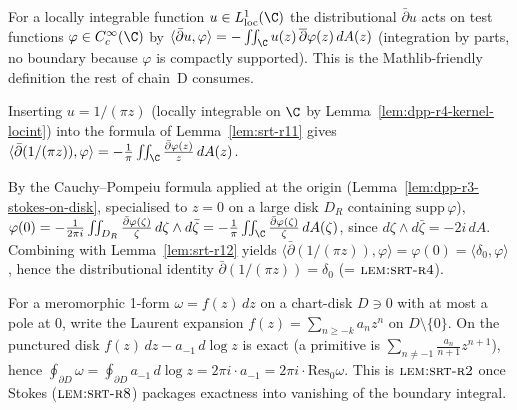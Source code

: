 \begin{lemma}
\label{lem:srt-r11}
For a locally integrable function $u \in L^{1}_{\mathrm{loc}}(\C)$
the distributional $\bar\partial u$ acts on test functions
$\varphi \in C^{\infty}_{c}(\C)$ by
$\langle \bar\partial u, \varphi\rangle = -\iint_{\C} u(z)\,
\overline{\partial}\varphi(z)\,dA(z)$
(integration by parts, no boundary because $\varphi$ is compactly
supported).  This is the Mathlib-friendly definition the rest of
chain~D consumes.
\leanok
\end{lemma}

\begin{lemma}
\label{lem:srt-r12}
Inserting $u = 1/(\pi z)$ (locally integrable on $\C$ by
Lemma~\ref{lem:dpp-r4-kernel-locint}) into the formula of
Lemma~\ref{lem:srt-r11} gives
$\langle \bar\partial(1/(\pi z)), \varphi\rangle =
-\frac{1}{\pi}\iint_{\C} \frac{\bar\partial \varphi(z)}{z}\,dA(z)$.
\leanok
\end{lemma}

\begin{lemma}
\label{lem:srt-r13}
By the Cauchy--Pompeiu formula applied at the origin
(Lemma~\ref{lem:dpp-r3-stokes-on-disk}, specialised to $z = 0$
on a large disk $D_{R}$ containing $\mathrm{supp}\,\varphi$),
$\varphi(0) = -\frac{1}{2\pi i}\iint_{D_{R}}
\frac{\bar\partial\varphi(\zeta)}{\zeta}\,d\zeta\wedge d\bar\zeta
= -\frac{1}{\pi}\iint_{\C}\frac{\bar\partial\varphi(\zeta)}{\zeta}\,
dA(\zeta)$,
since $d\zeta \wedge d\bar\zeta = -2i\,dA$.  Combining with
Lemma~\ref{lem:srt-r12} yields
$\langle \bar\partial(1/(\pi z)), \varphi\rangle = \varphi(0) =
\langle \delta_{0}, \varphi\rangle$, hence the distributional identity
$\bar\partial(1/(\pi z)) = \delta_{0}$ (= $\textsc{lem:srt-r4}$).
\leanok
\end{lemma}

\begin{lemma}
\label{lem:srt-r14}
For a meromorphic 1-form $\omega = f(z)\,dz$ on a chart-disk
$D \ni 0$ with at most a pole at $0$, write the Laurent expansion
$f(z) = \sum_{n \geq -k} a_{n} z^{n}$ on $D \setminus \{0\}$.
On the punctured disk $f(z)\,dz - a_{-1}\,d\log z$ is exact (a
primitive is $\sum_{n \neq -1} \tfrac{a_{n}}{n+1} z^{n+1}$), hence
$\oint_{\partial D} \omega = \oint_{\partial D} a_{-1}\,d\log z =
2\pi i \cdot a_{-1} = 2\pi i \cdot \mathrm{Res}_{0}\omega$.  This is
$\textsc{lem:srt-r2}$ once Stokes ($\textsc{lem:srt-r8}$) packages
exactness into vanishing of the boundary integral.
\leanok
\end{lemma}

